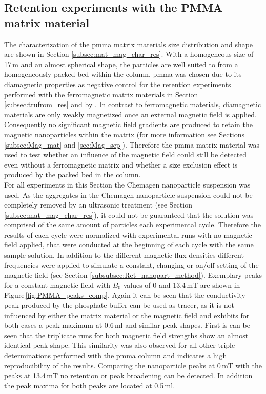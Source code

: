\subsection{Retention experiments with the PMMA matrix material}
\label{subsec:pmma_res}
The characterization of the \gls{pmma} matrix materials size distribution and shape are shown in Section \ref{subsec:mat_mag_char_res}. With a homogeneous size of 17\,\textmu m and an almost spherical shape, the particles are well suited to from a homogeneously packed bed within the column. \gls{pmma} was chosen due to its diamagnetic properties as negative control for the retention experiments performed with the ferromagnetic matrix materials in Section\,\ref{subsec:trufrom_res} and by \cite{AndreMaster}. In contrast to ferromagnetic materials, diamagnetic materials are only weakly magnetized once an external magnetic field is applied. Consequently no significant magnetic field gradients are produced to retain the magnetic nanoparticles within the matrix (for more information see Sections\,\ref{subsec:Mag_mat} and \ref{sec:Mag_sep}). Therefore the \gls{pmma} matrix material was used to test whether an influence of the magnetic field could still be detected even without a ferromagnetic matrix and whether a size exclusion effect is produced by the packed bed in the column. \\
For all experiments in this Section the Chemagen nanoparticle suspension was used. 
As the aggregates in the Chemagen nanoparticle suspension could not be completely removed by an ultrasonic treatment (see Section \ref{subsec:mat_mag_char_res}), it could not be guaranteed that the solution was comprised of the same amount of particles each experimental cycle. Therefore the results of each cycle were normalized with experimental runs with no magnetic field applied, that were conducted at the beginning of each cycle with the same sample solution. In addition to the different magnetic flux densities different frequencies were applied to simulate a constant, changing or on/off setting of the magnetic field (see Section \ref{subsubsec:Ret_nanopart_method}). \newline
Exemplary peaks for a constant magnetic field with $B_{0}$ values of 0 and 13.4\,mT are shown in Figure\,\ref{fig:PMMA_peaks_comp}. Again it can be seen that the conductivity peak produced by the phosphate buffer can be used as tracer, as it is not influenced by either the matrix material or the magnetic field and exhibits for both cases a peak maximum at 0.6\,ml and similar peak shapes. First is can be seen that the triplicate runs for both magnetic field strengths show an almost identical peak shape. This similarity was also observed for all other triple determinations performed with the \gls{pmma} column and indicates a high reproducibility of the results. Comparing the nanoparticle peaks at 0\,mT with the peaks at 13.4\,mT no retention or peak broadening can be detected. In addition the peak maxima for both peaks are located at 0.5\,ml. 

